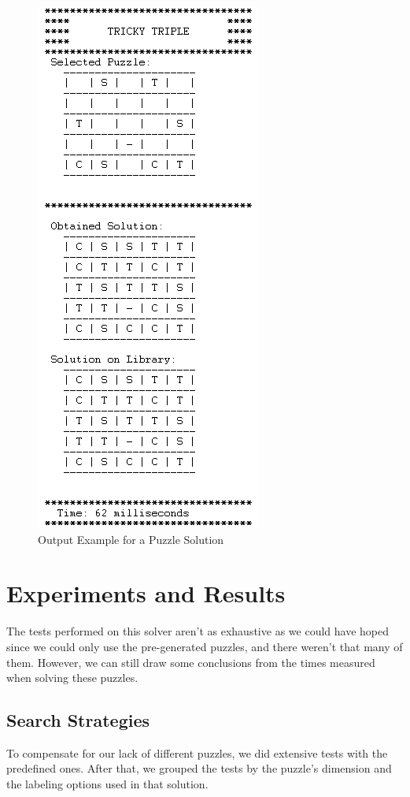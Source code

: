 \documentclass[runningheads]{llncs}
\begin{document}
\begin{figure}
    \centering
    \includegraphics[scale=0.4]{img/puzzle_solving.png}
    \caption{Output Example for a Puzzle Solution} \label{fig2}
\end{figure}

\section{Experiments and Results}
The tests performed on this solver aren't as exhaustive as we could have hoped since
    we could only use the pre-generated puzzles, and there weren't that many of them.
However, we can still draw some conclusions from the times measured when solving these puzzles.

\subsection{Search Strategies}
To compensate for our lack of different puzzles, we did extensive tests with the predefined ones.
After that, we grouped the tests by the puzzle's dimension and the labeling options used in that solution.
\end{document}
